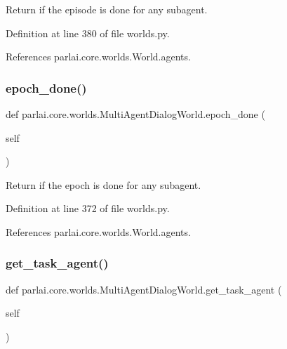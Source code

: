 \begin{DoxyVerb}Return if the episode is done for any subagent.\end{DoxyVerb}
 

Definition at line 380 of file worlds.\+py.



References parlai.\+core.\+worlds.\+World.\+agents.

\mbox{\label{classparlai_1_1core_1_1worlds_1_1MultiAgentDialogWorld_ade057311db0368be26ac8b196619b862}} 
\subsubsection{\texorpdfstring{epoch\+\_\+done()}{epoch\_done()}}
{\footnotesize\ttfamily def parlai.\+core.\+worlds.\+Multi\+Agent\+Dialog\+World.\+epoch\+\_\+done (\begin{DoxyParamCaption}\item[{}]{self }\end{DoxyParamCaption})}

\begin{DoxyVerb}Return if the epoch is done for any subagent.\end{DoxyVerb}
 

Definition at line 372 of file worlds.\+py.



References parlai.\+core.\+worlds.\+World.\+agents.

\mbox{\label{classparlai_1_1core_1_1worlds_1_1MultiAgentDialogWorld_a58ea065f63c441f27c97b6cb649ccf53}} 
\subsubsection{\texorpdfstring{get\+\_\+task\+\_\+agent()}{get\_task\_agent()}}
{\footnotesize\ttfamily def parlai.\+core.\+worlds.\+Multi\+Agent\+Dialog\+World.\+get\+\_\+task\+\_\+agent (\begin{DoxyParamCaption}\item[{}]{self }\end{DoxyParamCaption})}

